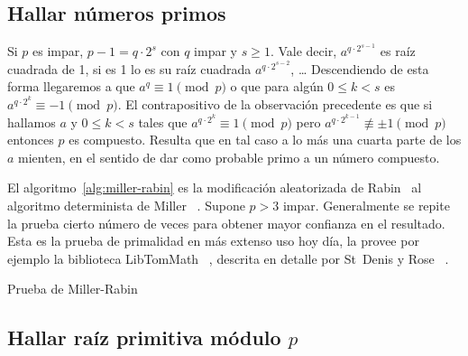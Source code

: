 \subsection{Hallar números primos}
\label{sec:nt-prime-numbers}

  Si \(p\) es impar,
  \(p - 1 = q \cdot 2^s\) con \(q\) impar y \(s \ge 1\).
  Vale decir,
  \(a^{q \cdot 2^{s - 1}}\) es raíz cuadrada de \num{1},
  si es \num{1} lo es su raíz cuadrada \(a^{q \cdot 2^{s - 2}}\),
  \ldots
  Descendiendo de esta forma llegaremos a que \(a^q \equiv 1 \pmod{p}\)
  o que para algún \(0 \le k < s\) es \(a^{q \cdot 2^k} \equiv -1 \pmod{p}\).
  El contrapositivo de la observación precedente
  es que si hallamos \(a\) y \(0 \le k < s\)
  tales que \(a^{q \cdot 2^k} \equiv 1 \pmod{p}\)
  pero \(a^{q \cdot 2^{k - 1}} \not\equiv \pm 1 \pmod{p}\)
  entonces \(p\) es compuesto.
  Resulta que en tal caso a lo más una cuarta parte de los \(a\)
  mienten,
  en el sentido de dar como probable primo a un número compuesto.

  El algoritmo~\ref{alg:miller-rabin}
  es la modificación aleatorizada de Rabin~%
     \cite{rabin80:_probab_algor_test_primality}
  al algoritmo determinista de Miller~%
     \cite{miller76:_Riemann_hypot_tests_primality}.
  Supone \(p > 3\) impar.
  Generalmente se repite la prueba cierto número de veces
  para obtener mayor confianza en el resultado.
  Esta es la prueba de primalidad en más extenso uso hoy día,
  la provee por ejemplo la biblioteca LibTomMath~%
    \cite{teamtom19:_libtommath_1.2.0},
  descrita en detalle por St~Denis y Rose~%
    \cite{st_denis06:_bignum_math}.
  \begin{algorithm}
    \DontPrintSemicolon\Indp

    \caption{Prueba de Miller-Rabin}
    \label{alg:miller-rabin}
  \end{algorithm}

\subsection{Hallar raíz primitiva módulo \(p\)}
\label{sec:nt-primitive-root}


